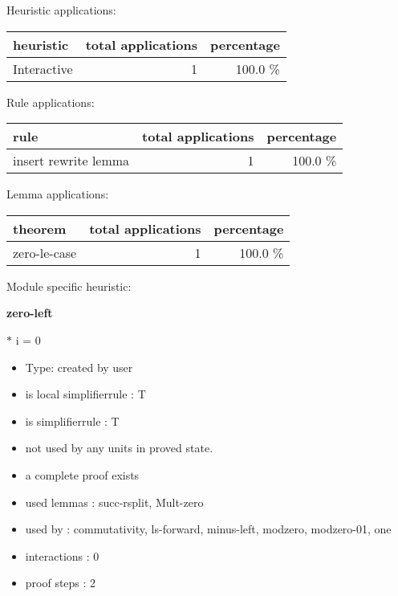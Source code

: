 \documentclass[a4paper]{article}
\begin{document}
\medskip


Heuristic applications:

\begin{supertabular}{l|r|r}
heuristic	& total applications & percentage \\ \hline
Interactive & 1 & 100.0 \% \\

\end{supertabular}

Rule applications:

\begin{supertabular}{l|r|r}
rule	        & total applications & percentage \\ \hline
insert rewrite lemma & 1 & 100.0 \% \\

\end{supertabular}

Lemma applications:

\begin{supertabular}{l|r|r}
theorem	        & total applications & percentage \\ \hline
zero-le-case & 1 & 100.0 \% \\

\end{supertabular}

Module specific heuristic:

\pagebreak

{\LARGE\bf zero-left}\label{lemma-zero-left}

\medskip

  $*$ i = 0

\begin{itemize}

\item Type: created by user

\item is local simplifierrule : T
\item is simplifierrule : T
\item not used by any units in proved state.
\item       a complete proof exists
\item       used lemmas  : succ-rsplit, Mult-zero
\item       used by      : commutativity, ls-forward, minus-left, modzero, modzero-01, one
\item       interactions : 0
\item       proof steps  : 2
\end{itemize}
\end{document}
